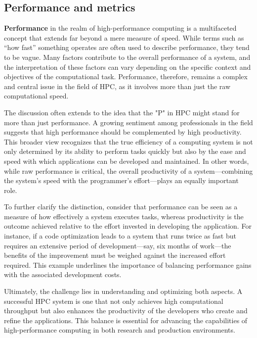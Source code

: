 \subsection{Performance and metrics} \label{sec:performance}

\textbf{Performance} in the realm of high-performance computing is a multifaceted concept that extends far beyond a mere measure of speed. While terms such as “how fast” something operates are often used to describe performance, they tend to be vague. Many factors contribute to the overall performance of a system, and the interpretation of these factors can vary depending on the specific context and objectives of the computational task. Performance, therefore, remains a complex and central issue in the field of HPC, as it involves more than just the raw computational speed.

The discussion often extends to the idea that the "P" in HPC might stand for more than just performance. A growing sentiment among professionals in the field suggests that high performance should be complemented by high productivity. This broader view recognizes that the true efficiency of a computing system is not only determined by its ability to perform tasks quickly but also by the ease and speed with which applications can be developed and maintained. In other words, while raw performance is critical, the overall productivity of a system—combining the system's speed with the programmer's effort—plays an equally important role.

To further clarify the distinction, consider that performance can be seen as a measure of how effectively a system executes tasks, whereas productivity is the outcome achieved relative to the effort invested in developing the application. For instance, if a code optimization leads to a system that runs twice as fast but requires an extensive period of development—say, six months of work—the benefits of the improvement must be weighed against the increased effort required. This example underlines the importance of balancing performance gains with the associated development costs.

Ultimately, the challenge lies in understanding and optimizing both aspects. A successful HPC system is one that not only achieves high computational throughput but also enhances the productivity of the developers who create and refine the applications. This balance is essential for advancing the capabilities of high-performance computing in both research and production environments.

